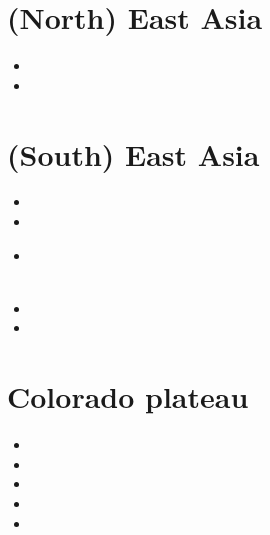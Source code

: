 \section{(North) East Asia}

\begin{small}
\begin{itemize}
\item[\twothousandeighteen]
\item[\twothousandtwentyone] 
\end{itemize}
\end{small}

\section{(South) East Asia}

\begin{small}
\begin{itemize}
\item[\twothousand]
\item[\twothousandfour]
\item[\twothousandfifteen]
 \\
 \\
\item[\twothousandsixteen]
\item[\twothousandtwentytwo] 
\end{itemize}
\end{small}

\section{Colorado plateau}

\begin{small}
\begin{itemize}
\item[\nineteenseventynine]
\item[\twothousandten]
\item[\twothousandeleven]
\item[\twothousandsixteen]
\item[\twothousandtwentythree] 
\end{itemize}
\end{small}


